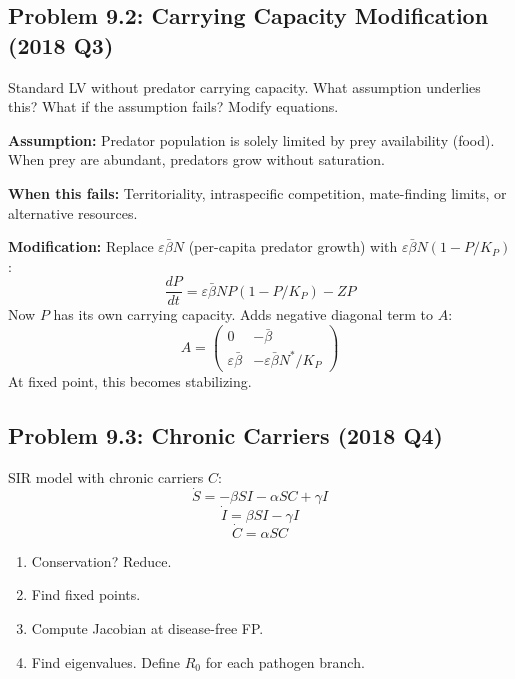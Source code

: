 \documentclass[10pt]{article}
\begin{document}
\subsection{Problem 9.2: Carrying Capacity Modification (2018 Q3)}

\begin{problem}
Standard LV without predator carrying capacity. What assumption underlies this?
What if the assumption fails? Modify equations.
\end{problem}

\begin{solution}
\textbf{Assumption:} Predator population is solely limited by prey availability (food). When prey are abundant, predators grow without saturation.

\textbf{When this fails:} Territoriality, intraspecific competition, mate-finding limits, or alternative resources.

\textbf{Modification:} Replace $\varepsilon\bar\beta N$ (per-capita predator growth) with $\varepsilon\bar\beta N(1 - P/K_P)$:
\[
\frac{dP}{dt} = \varepsilon\bar\beta NP(1 - P/K_P) - ZP
\]
Now $P$ has its own carrying capacity. Adds negative diagonal term to $A$:
\[
A = \begin{pmatrix} 0 & -\bar\beta \\ \varepsilon\bar\beta & -\varepsilon\bar\beta N^*/K_P \end{pmatrix}
\]
At fixed point, this becomes stabilizing.
\end{solution}

\subsection{Problem 9.3: Chronic Carriers (2018 Q4)}

\begin{problem}
SIR model with chronic carriers $C$:
\[
\dot S = -\beta SI - \alpha SC + \gamma I
\]
\[
\dot I = \beta SI - \gamma I
\]
\[
\dot C = \alpha SC
\]
\begin{enumerate}[label=(\alph*)]
\item Conservation? Reduce.
\item Find fixed points.
\item Compute Jacobian at disease-free FP.
\item Find eigenvalues. Define $R_0$ for each pathogen branch.
\end{enumerate}
\end{problem}
\end{document}
